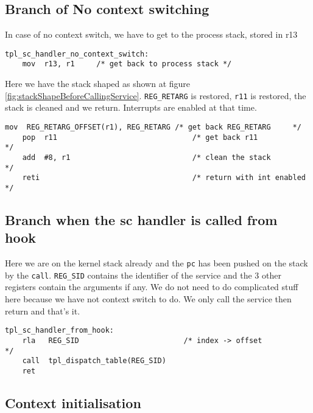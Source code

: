 \documentclass[11pt, oneside]{article}   	%
\begin{document}
\subsection{Branch of No context switching}

In case of no context switch, we have to get to the process stack, stored in r13

\begin{lstlisting}[backgroundcolor=\color{red!15}]
tpl_sc_handler_no_context_switch:
    mov  r13, r1	 /* get back to process stack */
\end{lstlisting}

Here we have the stack shaped as shown at figure \ref{fig:stackShapeBeforeCallingService}.
\lstinline{REG_RETARG} is restored, \lstinline{r11} is restored, the stack is cleaned and we return. Interrupts are enabled at that time.

\begin{lstlisting}[backgroundcolor=\color{yellow!15}]
    mov  REG_RETARG_OFFSET(r1), REG_RETARG /* get back REG_RETARG     */
    pop  r11                               /* get back r11            */
    add  #8, r1                            /* clean the stack         */
    reti                                   /* return with int enabled */
\end{lstlisting}

\subsection{Branch when the sc handler is called from hook}

Here we are on the kernel stack already and the \lstinline{pc} has been pushed on the stack by the \lstinline{call}. \lstinline{REG_SID} contains the identifier of the service and the 3 other registers contain the arguments if any. We do not need to do complicated stuff here because we have not context switch to do. We only call the service then return and that's it.

\begin{lstlisting}[backgroundcolor=\color{yellow!15}]
tpl_sc_handler_from_hook:
    rla   REG_SID                        /* index -> offset               */
    call  tpl_dispatch_table(REG_SID)
    ret
\end{lstlisting}

\subsection{Context initialisation}
\end{document}
